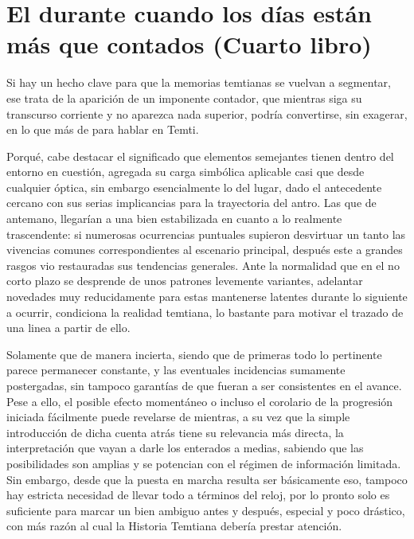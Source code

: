 \documentclass[
]{book}
\begin{document}
\hypertarget{el-durante-cuando-los-duxedas-estuxe1n-muxe1s-que-contados-cuarto-libro}{%
\chapter{El durante cuando los días están más que contados (Cuarto libro)}\label{el-durante-cuando-los-duxedas-estuxe1n-muxe1s-que-contados-cuarto-libro}}

Si hay un hecho clave para que la memorias temtianas se vuelvan a segmentar, ese trata de la aparición de un imponente contador, que mientras siga su transcurso corriente y no aparezca nada superior, podría convertirse, sin exagerar, en lo que más de para hablar en Temti.

Porqué, cabe destacar el significado que elementos semejantes tienen dentro del entorno en cuestión, agregada su carga simbólica aplicable casi que desde cualquier óptica, sin embargo esencialmente lo del lugar, dado el antecedente cercano con sus serias implicancias para la trayectoria del antro. Las que de antemano, llegarían a una bien estabilizada en cuanto a lo realmente trascendente: si numerosas ocurrencias puntuales supieron desvirtuar un tanto las vivencias comunes correspondientes al escenario principal, después este a grandes rasgos vio restauradas sus tendencias generales. Ante la normalidad que en el no corto plazo se desprende de unos patrones levemente variantes, adelantar novedades muy reducidamente para estas mantenerse latentes durante lo siguiente a ocurrir, condiciona la realidad temtiana, lo bastante para motivar el trazado de una linea a partir de ello.

Solamente que de manera incierta, siendo que de primeras todo lo pertinente parece permanecer constante, y las eventuales incidencias sumamente postergadas, sin tampoco garantías de que fueran a ser consistentes en el avance. Pese a ello, el posible efecto momentáneo o incluso el corolario de la progresión iniciada fácilmente puede revelarse de mientras, a su vez que la simple introducción de dicha cuenta atrás tiene su relevancia más directa, la interpretación que vayan a darle los enterados a medias, sabiendo que las posibilidades son amplias y se potencian con el régimen de información limitada. Sin embargo, desde que la puesta en marcha resulta ser básicamente eso, tampoco hay estricta necesidad de llevar todo a términos del reloj, por lo pronto solo es suficiente para marcar un bien ambiguo antes y después, especial y poco drástico, con más razón al cual la Historia Temtiana debería prestar atención.
\end{document}
